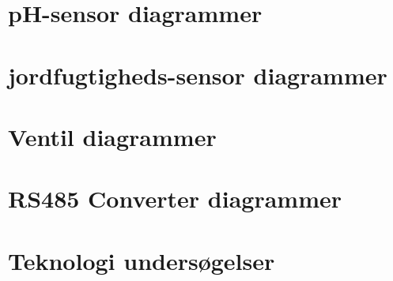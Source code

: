 \newpage

\section{pH-sensor diagrammer}

%

\newpage

\section{jordfugtigheds-sensor diagrammer}



\newpage

\section{Ventil diagrammer}



\newpage

\section{RS485 Converter diagrammer}

\newpage

\section{Teknologi undersøgelser}

